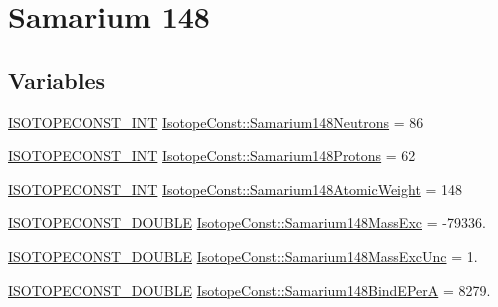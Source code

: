 \hypertarget{group___isotope_const-_samarium-_sm148}{}\section{Samarium 148}
\label{group___isotope_const-_samarium-_sm148}
\subsection*{Variables}
\begin{DoxyCompactItemize}
\item 
\mbox{\hyperlink{group___isotope_const-_macros_ga5f18360b3e99483a35c32d789e62621c}{I\+S\+O\+T\+O\+P\+E\+C\+O\+N\+S\+T\+\_\+\+I\+NT}} \mbox{\hyperlink{group___isotope_const-_samarium-_sm148_ga75865c90c0494f276ada67d6dec184a6}{Isotope\+Const\+::\+Samarium148\+Neutrons}} = 86
\item 
\mbox{\hyperlink{group___isotope_const-_macros_ga5f18360b3e99483a35c32d789e62621c}{I\+S\+O\+T\+O\+P\+E\+C\+O\+N\+S\+T\+\_\+\+I\+NT}} \mbox{\hyperlink{group___isotope_const-_samarium-_sm148_gac87c7565b5eda8492e615029c2e68ff4}{Isotope\+Const\+::\+Samarium148\+Protons}} = 62
\item 
\mbox{\hyperlink{group___isotope_const-_macros_ga5f18360b3e99483a35c32d789e62621c}{I\+S\+O\+T\+O\+P\+E\+C\+O\+N\+S\+T\+\_\+\+I\+NT}} \mbox{\hyperlink{group___isotope_const-_samarium-_sm148_ga239ed760f835f97f97d121a14a60ff1a}{Isotope\+Const\+::\+Samarium148\+Atomic\+Weight}} = 148
\item 
\mbox{\hyperlink{group___isotope_const-_macros_ga8f45a7272ce02c0b4c65c44636ed719a}{I\+S\+O\+T\+O\+P\+E\+C\+O\+N\+S\+T\+\_\+\+D\+O\+U\+B\+LE}} \mbox{\hyperlink{group___isotope_const-_samarium-_sm148_gade969bb7ee545825d3b393b0dc5faa73}{Isotope\+Const\+::\+Samarium148\+Mass\+Exc}} = -\/79336.
\item 
\mbox{\hyperlink{group___isotope_const-_macros_ga8f45a7272ce02c0b4c65c44636ed719a}{I\+S\+O\+T\+O\+P\+E\+C\+O\+N\+S\+T\+\_\+\+D\+O\+U\+B\+LE}} \mbox{\hyperlink{group___isotope_const-_samarium-_sm148_ga0c1ac6f344305500427a07f1f292e7ef}{Isotope\+Const\+::\+Samarium148\+Mass\+Exc\+Unc}} = 1.
\item 
\mbox{\hyperlink{group___isotope_const-_macros_ga8f45a7272ce02c0b4c65c44636ed719a}{I\+S\+O\+T\+O\+P\+E\+C\+O\+N\+S\+T\+\_\+\+D\+O\+U\+B\+LE}} \mbox{\hyperlink{group___isotope_const-_samarium-_sm148_ga2191ad6a1268ce40bd67b51c6b4b279b}{Isotope\+Const\+::\+Samarium148\+Bind\+E\+PerA}} = 8279.
\item 

\end{DoxyCompactItemize}
